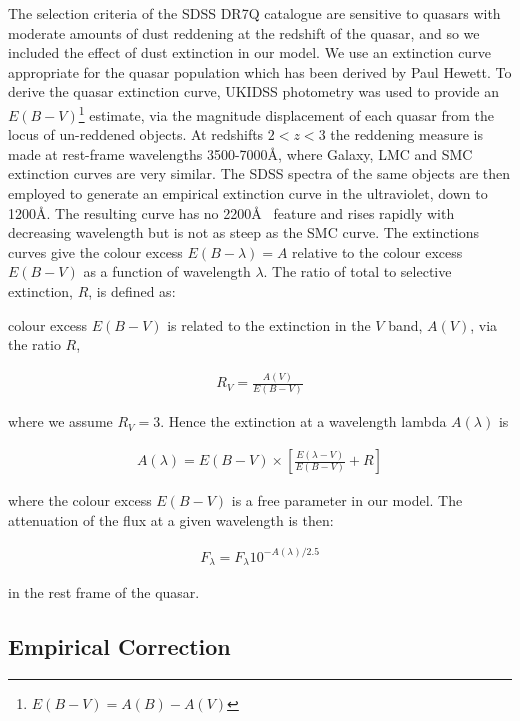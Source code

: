 The selection criteria of the SDSS DR7Q catalogue are sensitive to quasars with moderate amounts of dust reddening at the redshift of the quasar, and so we included the effect of dust extinction in our model. 
We use an extinction curve appropriate for the quasar population which has been derived by Paul Hewett. 
To derive the quasar extinction curve, UKIDSS photometry was used to provide an $E(B-V)$\footnote{$E(B-V)=A(B)-A(V)$} estimate, via the magnitude displacement of each quasar from the locus of un-reddened objects. 
At redshifts $2 < z < 3$ the reddening measure is made at rest-frame wavelengths 3500-7000\AA, where Galaxy, LMC and SMC extinction curves are very similar. 
The SDSS spectra of the same objects are then employed to generate an empirical extinction curve in the ultraviolet, down to 1200\AA. 
The resulting curve has no 2200\AA~ feature and rises rapidly with decreasing wavelength but is not as steep as the SMC curve. 
The extinctions curves give the colour excess $E(B-\lambda) = A$ relative to the colour excess $E(B-V)$ as a function of wavelength $\lambda$. 
The ratio of total to selective extinction, $R$, is defined as: 

colour excess $E(B-V)$ is related to the extinction in the $V$ band, $A(V)$, via the ratio  $R$, 

\begin{eqnarray}
  R_V = \frac{A(V)}{E(B-V)}
\end{eqnarray}

where we assume $R_V = 3$. 
Hence the extinction at a wavelength lambda $A(\lambda)$ is 

\begin{eqnarray}
  A(\lambda) = E(B-V) \times \left[ \frac{E(\lambda-V)}{E(B-V)} + R \right] 
\end{eqnarray}

where the colour excess $E(B-V)$ is a free parameter in our model. 
The attenuation of the flux at a given wavelength is then:

\begin{eqnarray}
  F_\lambda = F_\lambda10^{-A(\lambda)/2.5}
\end{eqnarray}

in the rest frame of the quasar. 

\subsection{Empirical Correction}


